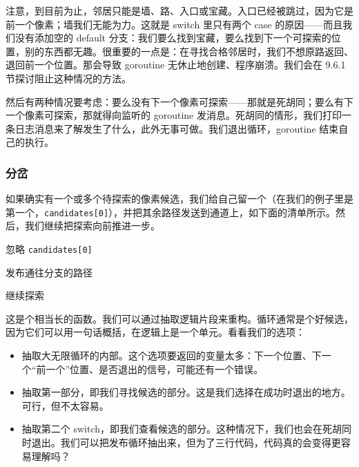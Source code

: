 注意，到目前为止，邻居只能是墙、路、入口或宝藏。入口已经被跳过，因为它是前一个像素；墙我们无能为力。这就是 switch 里只有两个 case 的原因——而且我们没有添加空的 default 分支：我们要么找到宝藏，要么找到下一个可探索的位置，别的东西都无趣。很重要的一点是：在寻找合格邻居时，我们不想原路返回、退回前一个位置。那会导致 goroutine 无休止地创建、程序崩溃。我们会在 9.6.1 节探讨阻止这种情况的方法。

然后有两种情况要考虑：要么没有下一个像素可探索——那就是死胡同；要么有下一个像素可探索，那就得向监听的 goroutine 发消息。死胡同的情形，我们打印一条日志消息来了解发生了什么，此外无事可做。我们退出循环，goroutine 结束自己的执行。

\subsubsection*{分岔}

如果确实有一个或多个待探索的像素候选，我们给自己留一个（在我们的例子里是第一个，\texttt{candidates[0]}），并把其余路径发送到通道上，如下面的清单所示。然后，我们继续把探索向前推进一步。


\begin{codeannotations}
\item 忽略 \texttt{candidates[0]}
\item 发布通往分支的路径
\item 继续探索
\end{codeannotations}

这是个相当长的函数。我们可以通过抽取逻辑片段来重构。循环通常是个好候选，因为它们可以用一句话概括，在逻辑上是一个单元。看看我们的选项：

\begin{itemize}
  \item 抽取大无限循环的内部。这个选项要返回的变量太多：下一个位置、下一个``前一个''位置、是否退出的信号，可能还有一个错误。
  \item 抽取第一部分，即我们寻找候选的部分。这是我们选择在成功时退出的地方。可行，但不太容易。
  \item 抽取第二个 switch，即我们查看候选的部分。这种情况下，我们也会在死胡同时退出。我们可以把发布循环抽出来，但为了三行代码，代码真的会变得更容易理解吗？
\end{itemize}

